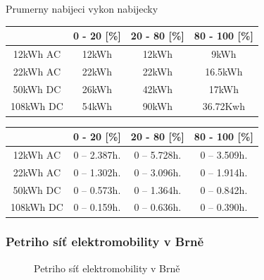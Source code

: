 \documentclass[a4paper,11pt]{article}
\begin{document}
Prumerny nabijeci vykon nabijecky
\smallskip

\begin{center}
    \vspace{0.5cm} %
    \begin{tabular}{|c|c|c|c|}
        \hline
        \textbf{} & \textbf{0 - 20 [\%]} & \textbf{20 - 80 [\%]} & \textbf{80 - 100 [\%]}\\
        \hline
        12kWh AC  &  12kWh  & 12kWh & 9kWh  \\
        \hline
        22kWh AC  &  22kWh  & 22kWh & 16.5kWh  \\
        \hline
        50kWh DC  &  26kWh  & 42kWh & 17kWh    \\
        \hline
        108kWh DC &  54kWh  & 90kWh & 36.72Kwh \\
        \hline
    \end{tabular}
    \vspace{0.5cm} %
\end{center}

\begin{center}
    \vspace{0.5cm} %
    \begin{tabular}{|c|c|c|c|}
        \hline
        \textbf{} & \textbf{0 - 20 [\%]} & \textbf{20 - 80 [\%]} & \textbf{80 - 100 [\%]}\\
        \hline
        12kWh AC  &  0 -- 2.387h.  & 0 -- 5.728h. & 0 -- 3.509h.  \\
        \hline
        22kWh AC  &  0 -- 1.302h.  & 0 -- 3.096h. & 0 -- 1.914h.  \\
        \hline
        50kWh DC  &  0 -- 0.573h.  & 0 -- 1.364h. & 0 -- 0.842h.  \\
        \hline
        108kWh DC &  0 -- 0.159h.  & 0 -- 0.636h. & 0 -- 0.390h.  \\
        \hline
    \end{tabular}
    \vspace{0.5cm} %
\end{center}

\subsubsection{Petriho síť elektromobility v Brně}

\begin{figure}[H]
    \centering
    \caption{Petriho síť elektromobility v Brně}
    \label{figure:ims-petri-net}
\end{figure}
\end{document}

